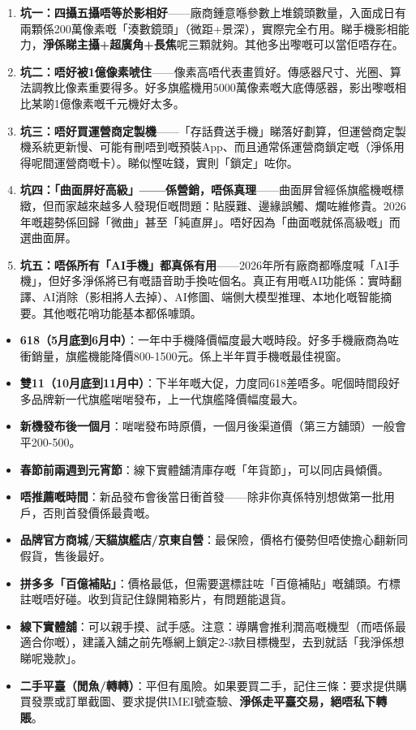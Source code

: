 \begin{enumerate}
  \item \textbf{坑一：四攝五攝唔等於影相好}——廠商鍾意喺參數上堆鏡頭數量，入面成日有兩顆係200萬像素嘅「湊數鏡頭」（微距+景深），實際完全冇用。睇手機影相能力，\textbf{淨係睇主攝+超廣角+長焦}呢三顆就夠。其他多出嚟嘅可以當佢唔存在。
  \item \textbf{坑二：唔好被1億像素唬住}——像素高唔代表畫質好。傳感器尺寸、光圈、算法調教比像素重要得多。好多旗艦機用5000萬像素嘅大底傳感器，影出嚟嘅相比某啲1億像素嘅千元機好太多。
  \item \textbf{坑三：唔好買運營商定製機}——「存話費送手機」睇落好劃算，但運營商定製機系統更新慢、可能有刪唔到嘅預裝App、而且通常係運營商鎖定嘅（淨係用得呢間運營商嘅卡）。睇似慳咗錢，實則「鎖定」咗你。
  \item \textbf{坑四：「曲面屏好高級」——係營銷，唔係真理}——曲面屏曾經係旗艦機嘅標緻，但而家越來越多人發現佢嘅問題：貼膜難、邊緣誤觸、爛咗維修貴。2026年嘅趨勢係回歸「微曲」甚至「純直屏」。唔好因為「曲面嘅就係高級嘅」而選曲面屏。
  \item \textbf{坑五：唔係所有「AI手機」都真係有用}——2026年所有廠商都喺度喊「AI手機」，但好多淨係將已有嘅語音助手換咗個名。真正有用嘅AI功能係：實時翻譯、AI消除（影相將人去掉）、AI修圖、端側大模型推理、本地化嘅智能摘要。其他嘅花哨功能基本都係噱頭。
\end{enumerate}


\begin{itemize}
  \item \textbf{618（5月底到6月中）}：一年中手機降價幅度最大嘅時段。好多手機廠商為咗衝銷量，旗艦機能降價800-1500元。係上半年買手機嘅最佳視窗。
  \item \textbf{雙11（10月底到11月中）}：下半年嘅大促，力度同618差唔多。呢個時間段好多品牌新一代旗艦啱啱發布，上一代旗艦降價幅度最大。
  \item \textbf{新機發布後一個月}：啱啱發布時原價，一個月後渠道價（第三方舖頭）一般會平200-500。
  \item \textbf{春節前兩週到元宵節}：線下實體舖清庫存嘅「年貨節」，可以同店員傾價。
  \item \textbf{唔推薦嘅時間}：新品發布會後當日衝首發——除非你真係特別想做第一批用戶，否則首發價係最貴嘅。
\end{itemize}


\begin{itemize}
  \item \textbf{品牌官方商城/天貓旗艦店/京東自營}：最保險，價格冇優勢但唔使擔心翻新同假貨，售後最好。
  \item \textbf{拼多多「百億補貼」}：價格最低，但需要選標註咗「百億補貼」嘅舖頭。冇標註嘅唔好碰。收到貨記住錄開箱影片，有問題能退貨。
  \item \textbf{線下實體舖}：可以親手摸、試手感。注意：導購會推利潤高嘅機型（而唔係最適合你嘅），建議入舖之前先喺網上鎖定2-3款目標機型，去到就話「我淨係想睇呢幾款」。
  \item \textbf{二手平臺（閒魚/轉轉）}：平但有風險。如果要買二手，記住三條：要求提供購買發票或訂單截圖、要求提供IMEI號查驗、\textbf{淨係走平臺交易，絕唔私下轉賬}。
\end{itemize}

